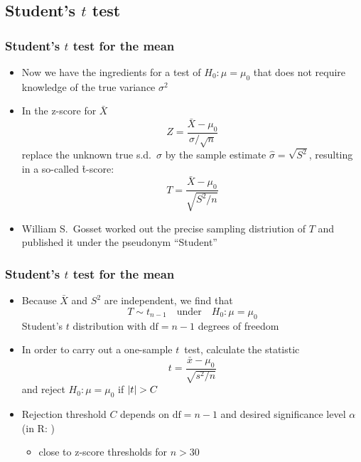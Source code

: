 \documentclass[handout,notes=show,t]{beamer} %
\begin{document}
\subsection{Student's $t$ test}

\begin{frame}
  \frametitle{Student's $t$ test for the mean}

  \begin{itemize}
  \item Now we have the ingredients for a test of $H_0: \mu = \mu_0$ that does
    not require knowledge of the true variance $\sigma^2$
  \item In the z-score for $\bar{X}$
    \[
    Z = \frac{\bar{X} - \mu_0}{\sigma / \sqrt{n}}
    \]
    replace the unknown true s.d.\ $\sigma$ by the sample estimate
    $\hat{\sigma} = \sqrt{S^2}$, resulting in a so-called \h{t-score}:
    \[    
    T = \frac{\bar{X} - \mu_0}{\sqrt{S^2 / n}}
    \]
  \item William S.\ Gosset worked out the precise sampling distriution of
    $T$ and published it under the pseudonym ``Student''
  \end{itemize}
\end{frame}  

\begin{frame}
  \frametitle{Student's $t$ test for the mean}

  \begin{itemize}
  \item Because $\bar{X}$ and $S^2$ are independent, we find that
    \[
    T \sim t_{n-1} \quad\text{under}\quad H_0: \mu = \mu_0
    \]
    Student's \h{$t$ distribution} with $\text{df} = n-1$ degrees of freedom
  \item In order to carry out a one-sample $t$~test, calculate the statistic
    \[
    t = \frac{\bar{x} - \mu_0}{\sqrt{s^2 / n}}    
    \]
    and reject $H_0: \mu=\mu_0$ if $\lvert t\rvert > C$
  \item Rejection threshold $C$ depends on $\text{df} = n-1$ and desired
    significance level $\alpha$ (in R: )
    \begin{itemize}
    \item[\hand] close to z-score thresholds for $n > 30$
    \end{itemize}
  \end{itemize}
\end{frame}
\end{document}
